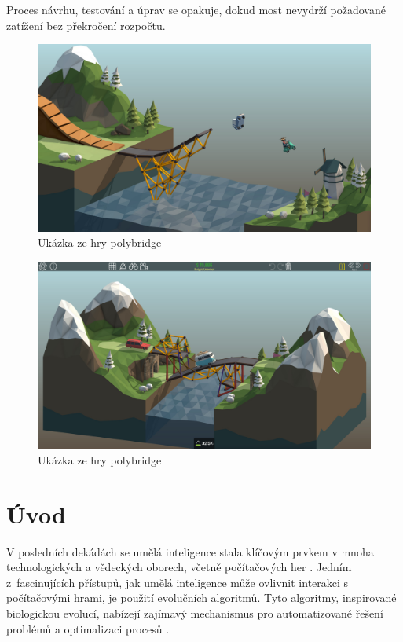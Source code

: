 Proces návrhu, testování a úprav se opakuje, dokud most nevydrží požadované zatížení bez překročení rozpočtu.

\begin{figure}[p]\centering
\includegraphics[width=\linewidth]{img/poly_screen_1.jpg}
\caption{Ukázka ze hry polybridge \citet{drycactus}}
\label{poly-fig:1}

\end{figure}

\begin{figure}[p]\centering
\includegraphics[width=\linewidth]{img/poly_screen_2.jpg}
\caption{Ukázka ze hry polybridge \citet{drycactus}}
\label{poly-fig:2}
\end{figure}


\chapter*{Úvod}

V posledních dekádách se umělá inteligence stala klíčovým prvkem v mnoha technologických a vědeckých oborech, včetně počítačových her \cite{mnih2013playing} \cite{Vinyals2019}. Jedním z~fascinujících přístupů, jak umělá inteligence může ovlivnit interakci s počítačovými hrami, je použití evolučních algoritmů. Tyto algoritmy, inspirované biologickou evolucí, nabízejí zajímavý mechanismus pro automatizované řešení problémů a optimalizaci procesů \cite{EibenSmith2015}.

